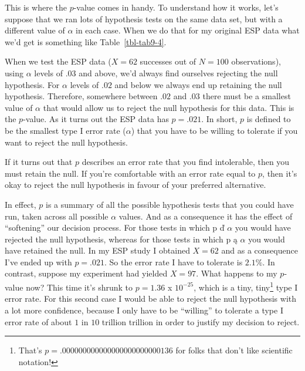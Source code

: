 \documentclass[
  a4paper,
]{book}
\begin{document}
This is where the \(p\)-value comes in handy. To understand how it
works, let's suppose that we ran lots of hypothesis tests on the same
data set, but with a different value of \(\alpha\) in each case. When we
do that for my original ESP data what we'd get is something like
Table~\ref{tbl-tab9-4}.

\begin{table}

\caption{\label{tbl-tab9-4}Rejecting the null hypothesis at different
levels of alpha}

\centering
{}

\end{table}%

When we test the ESP data (\(X = 62\) successes out of \(N = 100\)
observations), using \(\alpha\) levels of \(.03\) and above, we'd always
find ourselves rejecting the null hypothesis. For \(\alpha\) levels of
\(.02\) and below we always end up retaining the null hypothesis.
Therefore, somewhere between \(.02\) and \(.03\) there must be a
smallest value of \(\alpha\) that would allow us to reject the null
hypothesis for this data. This is the \(p\)-value. As it turns out the
ESP data has \(p = .021\). In short, \(p\) is defined to be the smallest
type I error rate (\(\alpha\)) that you have to be willing to tolerate
if you want to reject the null hypothesis.

If it turns out that \(p\) describes an error rate that you find
intolerable, then you must retain the null. If you're comfortable with
an error rate equal to \(p\), then it's okay to reject the null
hypothesis in favour of your preferred alternative.

In effect, \(p\) is a summary of all the possible hypothesis tests that
you could have run, taken across all possible \(\alpha\) values. And as
a consequence it has the effect of ``softening'' our decision process.
For those tests in which p ď \(\alpha\) you would have rejected the null
hypothesis, whereas for those tests in which p ą \(\alpha\) you would
have retained the null. In my ESP study I obtained \(X = 62\) and as a
consequence I've ended up with \(p = .021\). So the error rate I have to
tolerate is \(2.1\%\). In contrast, suppose my experiment had yielded
\(X = 97\). What happens to my \(p\)-value now? This time it's shrunk to
\(p = 1.36\) x \(10^{-25}\), which is a tiny, tiny\footnote{That's
  \(p = .000000000000000000000000136\) for folks that don't like
  scientific notation!} type I error rate. For this second case I would
be able to reject the null hypothesis with a lot more confidence,
because I only have to be ``willing'' to tolerate a type I error rate of
about \(1\) in \(10\) trillion trillion in order to justify my decision
to reject.
\end{document}
